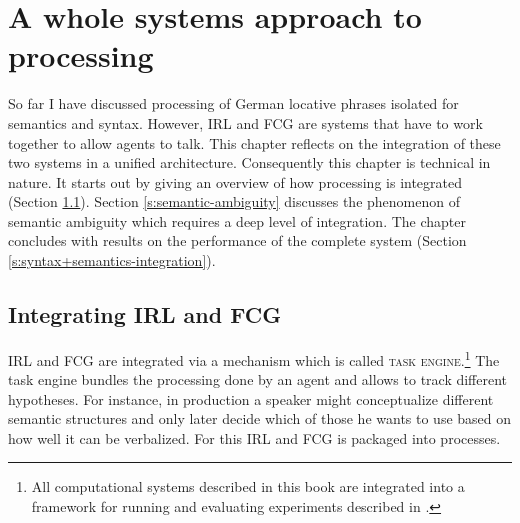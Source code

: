 %
\chapter{A whole systems approach to processing}
\label{s:german-locative-phrases-syntax-semantics-integration}
So far I have discussed processing of German locative phrases
isolated for semantics and syntax. However, IRL and FCG are systems that 
have to work together to allow agents to talk. This chapter reflects on the 
integration of these two systems in a unified architecture. 
Consequently this chapter is technical in nature. It starts out by giving
an overview of how processing is integrated (Section \ref{s:irl-fcg-integration}).
Section \ref{s:semantic-ambiguity} discusses the phenomenon of 
semantic ambiguity which requires a deep level of integration.
The chapter concludes with results on the performance of the 
complete system (Section \ref{s:syntax+semantics-integration}).


\section{Integrating IRL and FCG}
\label{s:irl-fcg-integration}
IRL and FCG are integrated via a mechanism which is called 
\textsc{task engine}.\footnote{All computational systems described in this 
book are integrated into a framework for running and evaluating 
experiments described in \cite{steels2010babel}.}
The task engine bundles the processing done by an agent and allows to track
different hypotheses. For instance, in production a speaker might conceptualize
different semantic structures and only later decide which of those he wants
to use based on how well it can be verbalized. For this IRL and FCG 
is packaged into processes.

